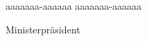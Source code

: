 \documentclass{book}
\begin{document}
aaaaaaa-aaaaaa aaaaaaa-aaaaaa

Ministerpräsident
\end{document}
